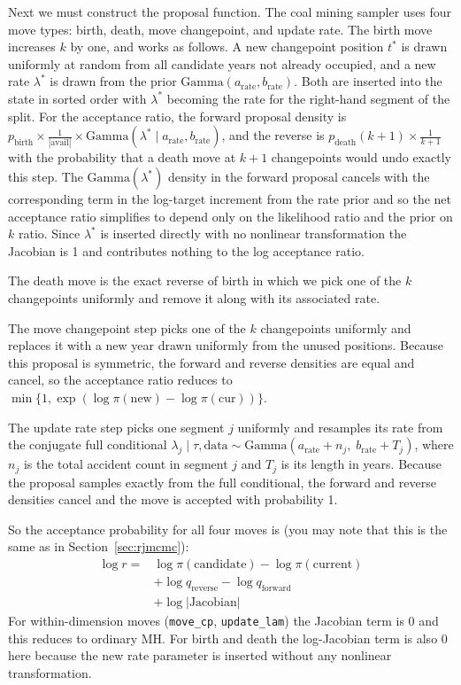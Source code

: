 \documentclass[10pt]{article}
\begin{document}
Next we must construct the proposal function. The coal mining sampler uses four move types: birth, death, move changepoint, and update rate.
The birth move increases \(k\) by one, and works as follows. A new changepoint position \(t^*\) is drawn uniformly at random from all candidate years not already occupied, and a new rate \(\lambda^*\) is drawn from the prior \(\text{Gamma}(a_\text{rate}, b_\text{rate})\). Both are inserted into the state in sorted order with \(\lambda^*\) becoming the rate for the right-hand segment of the split. For the acceptance ratio, the forward proposal density is \(p_\text{birth} \times \frac{1}{|\text{avail}|} \times \text{Gamma}(\lambda^* \mid a_\text{rate}, b_\text{rate})\), and the reverse is \(p_\text{death}(k+1) \times \frac{1}{k+1}\) with the probability that a death move at \(k+1\) changepoints would undo exactly this step. The \(\text{Gamma}(\lambda^*)\) density in the forward proposal cancels with the corresponding term in the log-target increment from the rate prior and so the net acceptance ratio simplifies to depend only on the likelihood ratio and the prior on \(k\) ratio. Since \(\lambda^*\) is inserted directly with no nonlinear transformation the Jacobian is 1 and contributes nothing to the log acceptance ratio.


The death move is the exact reverse of birth in which we pick one of the \(k\) changepoints uniformly and remove it along with its associated rate.


The move changepoint step picks one of the \(k\) changepoints uniformly and replaces it with a new year drawn uniformly from the unused positions. Because this proposal is symmetric, the forward and reverse densities are equal and cancel, so the acceptance ratio reduces to \(\min\{1, \exp(\log\pi(\text{new}) - \log\pi(\text{cur}))\}\).


The update rate step picks one segment \(j\) uniformly and resamples its rate from the conjugate full conditional \(\lambda_j \mid \tau, \text{data} \sim \text{Gamma}(a_\text{rate} + n_j,\; b_\text{rate} + T_j)\), where \(n_j\) is the total accident count in segment \(j\) and \(T_j\) is its length in years. Because the proposal samples exactly from the full conditional, the forward and reverse densities cancel and the move is accepted with probability 1.

So the acceptance probability for all four moves is (you may note that this is the same as in Section~\ref{sec:rjmcmc}):
\begin{align*}
\log r = & \log\pi(\text{candidate}) - \log\pi(\text{current}) \\
         & + \log q_\text{reverse} - \log q_\text{forward} \\
         & + \log|\text{Jacobian}|
\end{align*}
For within-dimension moves (\texttt{move\_cp}, \texttt{update\_lam}) the Jacobian term is 0 and this reduces to ordinary MH. For birth and death the log-Jacobian term is also 0 here because the new rate parameter is inserted without any nonlinear transformation.
\end{document}
